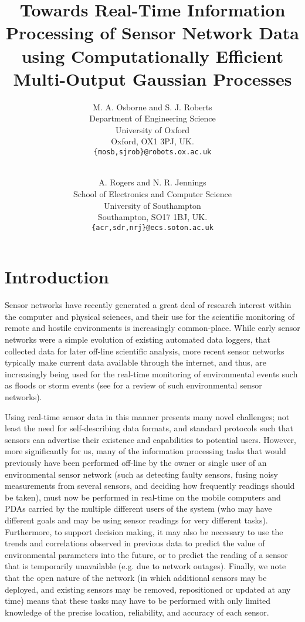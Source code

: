 \documentclass{acmtrans2m}
\title{Towards Real-Time Information Processing of Sensor Network Data using Computationally Efficient Multi-Output Gaussian Processes}
\author{M. A. Osborne and S. J. Roberts\\
Department of Engineering Science\\
University of Oxford\\
Oxford, OX1 3PJ, UK.\\
{\tt{\{mosb,sjrob\}@robots.ox.ac.uk}}\\
\and\\
A. Rogers and N. R. Jennings\\
School of Electronics and Computer Science\\
University of Southampton\\
Southampton, SO17 1BJ, UK.\\
{\tt{\{acr,sdr,nrj\}@ecs.soton.ac.uk}}\\
}
\begin{document}

\maketitle

\section{Introduction}

\noindent Sensor networks have recently generated a great deal of research interest within the computer and physical sciences, and their use for the scientific monitoring of remote and hostile environments is increasingly common-place. While early sensor networks were a simple evolution of existing automated data loggers, that collected data for later off-line scientific analysis, more recent sensor networks typically make current data available through the internet, and thus, are increasingly being used for the real-time monitoring of environmental events such as floods or storm events (see \cite{esn} for a review of such environmental sensor networks).

Using real-time sensor data in this manner presents many novel challenges; not least the need for self-describing data formats, and standard protocols such that sensors can advertise their existence and capabilities to potential users. However, more significantly for us, many of the information processing tasks that would previously have been performed off-line by the owner or single user of an environmental sensor network (such as detecting faulty sensors, fusing noisy measurements from several sensors, and deciding how frequently readings should be taken), must now be performed in real-time on the mobile computers and PDAs carried by the multiple different users of the system (who may have different goals and may be using sensor readings for very different tasks). Furthermore, to support decision making, it may also be necessary to use the trends and correlations observed in previous data to predict the value of environmental parameters into the future, or to predict the reading of a sensor that is temporarily unavailable (e.g. due to network outages). Finally, we note that the open nature of the network (in which additional sensors may be deployed, and existing sensors may be removed, repositioned or updated at any time) means that these tasks may have to be performed with only limited knowledge of the precise location, reliability, and accuracy of each sensor.
\end{document}
